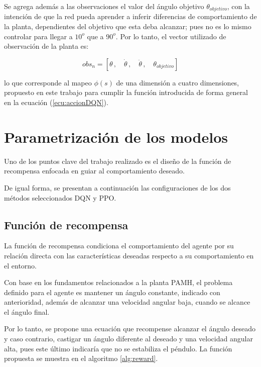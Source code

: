 Se agrega además a las observaciones el valor del ángulo objetivo $\theta_{objetivo}$, con la intención de que la red pueda aprender a inferir diferencias de comportamiento de la planta, dependientes del objetivo que esta deba alcanzar; pues no es lo mismo controlar para llegar a $10^o$ que a $90^o$. Por lo tanto, el vector utilizado de observación de la planta es:

\begin{equation}
obs_n = [\theta \, ,\quad \dot{\theta} \, ,\quad \ddot{\theta} \, ,\quad \theta_{objetivo}]
\label{ecu:observation}
\end{equation}

lo que corresponde al mapeo $\phi(s)$ de una dimensión a cuatro dimensiones, propuesto en este trabajo para cumplir la función introducida de forma general en la ecuación (\ref{ecu:accionDQN}).

\section{Parametrización de los modelos}

Uno de los puntos clave del trabajo realizado es el diseño de la función de recompensa enfocada en guiar al comportamiento deseado.

De igual forma, se presentan a continuación las configuraciones de los dos métodos seleccionados DQN y PPO.

\subsection{Función de recompensa}

La función de recompensa condiciona el comportamiento del agente por su relación directa con las características deseadas respecto a su comportamiento en el entorno.

Con base en los fundamentos relacionados a la planta PAMH, el problema definido para el agente es mantener un ángulo constante, indicado con anterioridad, además de alcanzar una velocidad angular baja, cuando se alcance el ángulo final.

Por lo tanto, se propone una ecuación que recompense alcanzar el ángulo deseado y caso contrario, castigar un ángulo diferente al deseado y una velocidad angular alta, pues este último indicaría que no se estabiliza el péndulo. La función propuesta se muestra en el algoritmo \ref{alg:reward}.

